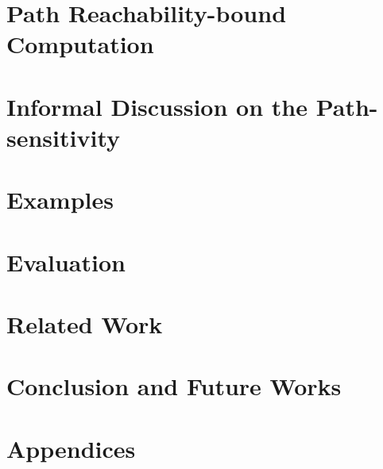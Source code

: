 \documentclass[a4paper,11pt]{article}
\begin{document}
\section{Path Reachability-bound Computation}
\label{sec:pathrb}


\section{Informal Discussion on the Path-sensitivity}
\label{sec:thminformal}

\section{Examples}
\label{sec:example}

\section{Evaluation}
\label{sec:eval}

\section{Related Work}
\label{sec:relatedwork}

%
\section{Conclusion and Future Works}
\label{sec:conlusion}

\clearpage




\clearpage

\appendix
{}
\section*{Appendices}

\end{document}
